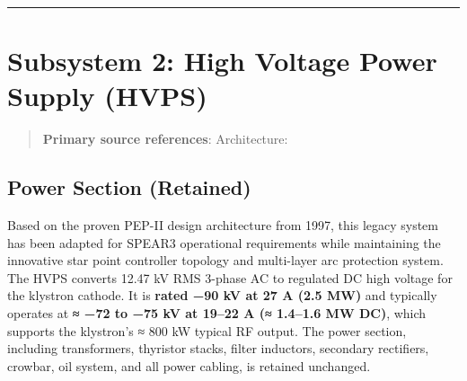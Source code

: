 {\begin{center}\rule{0.5\linewidth}{0.5pt}\end{center}

\section{Subsystem 2: High Voltage Power Supply (HVPS)}\label{subsystem-2-high-voltage-power-supply-hvps}

\begin{quote}
\textbf{Primary source references}: Architecture: 
\end{quote}

\subsection{Power Section (Retained)}\label{power-section-retained}

Based on the proven PEP-II design architecture from 1997, this legacy system has been adapted for SPEAR3 operational requirements while maintaining the innovative star point controller topology and multi-layer arc protection system. The HVPS converts 12.47 kV RMS 3-phase AC to regulated DC high voltage for the klystron cathode. It is \textbf{rated −90 kV at 27 A (2.5 MW)} and typically operates at \textbf{≈ −72 to −75 kV at 19--22 A (≈ 1.4--1.6 MW DC)}, which supports the klystron's ≈ 800 kW typical RF output. The power section, including transformers, thyristor stacks, filter inductors, secondary rectifiers, crowbar, oil system, and all power cabling, is retained unchanged.

}
